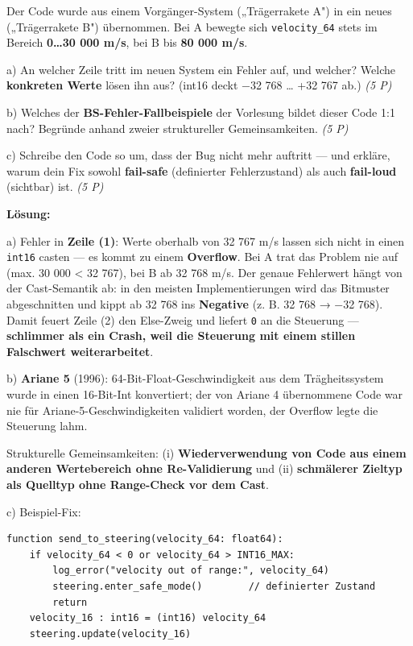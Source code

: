 \documentclass[11pt, a4paper]{article}
\begin{document}
Der Code wurde aus einem Vorgänger-System („Trägerrakete A") in ein neues („Trägerrakete B") übernommen. Bei A bewegte sich \texttt{velocity\_64} stets im Bereich \textbf{0…30 000 m/s}, bei B bis \textbf{80 000 m/s}.


a) An welcher Zeile tritt im neuen System ein Fehler auf, und welcher? Welche \textbf{konkreten Werte} lösen ihn aus? (int16 deckt −32 768 … +32 767 ab.) \textit{(5 P)}


b) Welches der \textbf{BS-Fehler-Fallbeispiele} der Vorlesung bildet dieser Code 1:1 nach? Begründe anhand zweier struktureller Gemeinsamkeiten. \textit{(5 P)}


c) Schreibe den Code so um, dass der Bug nicht mehr auftritt — und erkläre, warum dein Fix sowohl \textbf{fail-safe} (definierter Fehlerzustand) als auch \textbf{fail-loud} (sichtbar) ist. \textit{(5 P)}


\textbf{Lösung:}


a) Fehler in \textbf{Zeile (1)}: Werte oberhalb von 32 767 m/s lassen sich nicht in einen \texttt{int16} casten — es kommt zu einem \textbf{Overflow}. Bei A trat das Problem nie auf (max. 30 000 < 32 767), bei B ab 32 768 m/s. Der genaue Fehlerwert hängt von der Cast-Semantik ab: in den meisten Implementierungen wird das Bitmuster abgeschnitten und kippt ab 32 768 ins \textbf{Negative} (z. B. 32 768 → −32 768). Damit feuert Zeile (2) den Else-Zweig und liefert \texttt{0} an die Steuerung — \textbf{schlimmer als ein Crash, weil die Steuerung mit einem stillen Falschwert weiterarbeitet}.


b) \textbf{Ariane 5} (1996): 64-Bit-Float-Geschwindigkeit aus dem Trägheitssystem wurde in einen 16-Bit-Int konvertiert; der von Ariane 4 übernommene Code war nie für Ariane-5-Geschwindigkeiten validiert worden, der Overflow legte die Steuerung lahm.

Strukturelle Gemeinsamkeiten: (i) \textbf{Wiederverwendung von Code aus einem anderen Wertebereich ohne Re-Validierung} und (ii) \textbf{schmälerer Zieltyp als Quelltyp ohne Range-Check vor dem Cast}.


c) Beispiel-Fix:


\begin{lstlisting}
function send_to_steering(velocity_64: float64):
    if velocity_64 < 0 or velocity_64 > INT16_MAX:
        log_error("velocity out of range:", velocity_64)
        steering.enter_safe_mode()        // definierter Zustand
        return
    velocity_16 : int16 = (int16) velocity_64
    steering.update(velocity_16)
\end{lstlisting}
\end{document}
